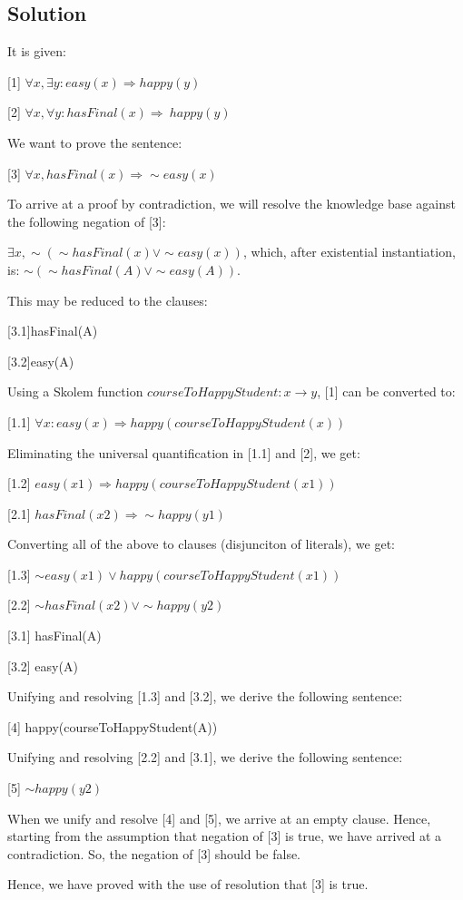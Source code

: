 \documentclass[a4paper,10pt]{article}
\begin{document}
\subsection{Solution}

It is given:

[1] $\forall x, \exists y: easy(x) \Rightarrow happy(y)$

[2] $\forall x, \forall y: hasFinal(x) \Rightarrow ~happy(y)$

We want to prove the sentence:

[3] $\forall x, hasFinal(x) \Rightarrow \sim easy(x)$

To arrive at a proof by contradiction, we will resolve the knowledge base against the following negation of [3]:

$\exists x, \sim(\sim hasFinal(x) \vee \sim easy(x))$, which, after existential instantiation, is: $\sim(\sim hasFinal(A) \vee \sim easy(A))$.

This may be reduced to the clauses:

[3.1]hasFinal(A)

[3.2]easy(A)

Using a Skolem function $courseToHappyStudent:x\longrightarrow y$, [1] can be converted to:

[1.1] $\forall x: easy(x) \Rightarrow happy(courseToHappyStudent(x))$

Eliminating the universal quantification in [1.1] and [2], we get:

[1.2] $easy(x1) \Rightarrow happy(courseToHappyStudent(x1))$

[2.1] $hasFinal(x2) \Rightarrow \sim happy(y1)$

Converting all of the above to clauses (disjunciton of literals), we get:

[1.3] $\sim easy(x1) \vee happy(courseToHappyStudent(x1))$

[2.2] $\sim hasFinal(x2) \vee \sim happy(y2)$

[3.1] hasFinal(A)

[3.2] easy(A)

Unifying and resolving [1.3] and [3.2], we derive the following sentence:

[4] happy(courseToHappyStudent(A))

Unifying and resolving [2.2] and [3.1], we derive the following sentence:

[5] $\sim happy(y2)$

When we unify and resolve [4] and [5], we arrive at an empty clause. Hence, starting from the assumption that negation of [3] is true, we have arrived at a contradiction. So, the negation of [3] should be false.

Hence, we have proved with the use of resolution that [3] is true.
\end{document}
